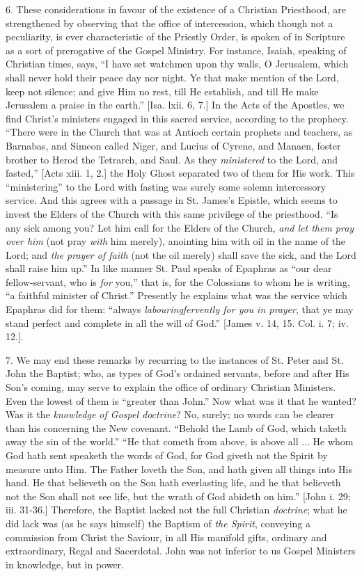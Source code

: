 6. These considerations in favour of the existence of a Christian
Priesthood, are strengthened by observing that the office of
intercession, which though not a peculiarity, is ever characteristic of
the Priestly Order, is spoken of in Scripture as a sort of prerogative
of the Gospel Ministry. For instance, Isaiah, speaking of Christian
times, says, ``I have set watchmen upon thy walls, O Jerusalem,
which shall never hold their peace day nor night. Ye that make mention
of the Lord, keep not silence; and give Him no rest, till He establish,
and till He make Jerusalem a praise in the earth.'' [Isa. lxii. 6,
7.] In the Acts of the Apostles, we find Christ's ministers engaged in
this sacred service, according to the prophecy. ``There were in the
Church that was at Antioch certain prophets and teachers, as Barnabas,
and Simeon called Niger, and Lucius of Cyrene, and Manaen, foster
brother to Herod the Tetrarch, and Saul. As they \emph{ministered} to
the Lord, and fasted,'' [Acts xiii. 1, 2.] the Holy Ghost separated
two of them for His work. This ``ministering'' to the Lord with
fasting was surely some solemn intercessory service. And this agrees
with a passage in St. James's Epistle, which seems to invest the Elders
of the Church with this same privilege of the priesthood. ``Is any
sick among you? Let him call for the Elders of the Church, \emph{and let
them pray over him} (not pray \emph{with} him merely), anointing him
with oil in the name of the Lord; and \emph{the prayer of faith} (not
the oil merely) shall save the sick, and the Lord shall raise him
up.'' In like manner St. Paul speaks of Epaphras as ``our dear
fellow-servant, who is \emph{for} you,'' that is, for the Colossians
to whom he is writing, ``a faithful minister of Christ.''
Presently he explains what was the service which Epaphras did for them:
``always \emph{labouring}\emph{fervently for you in prayer}, that ye may
stand perfect and complete in all the will of God.'' [James v. 14,
15. Col. i. 7; iv. 12.].

7. We may end these remarks by recurring to the instances of St.
Peter and St. John the Baptist; who, as types of God's ordained
servants, before and after His Son's coming, may serve to explain the
office of ordinary Christian Ministers. Even the lowest of them is
``greater than John.'' Now what was it that he wanted? Was it
the \emph{knowledge of Gospel doctrine}? No, surely; no words can be
clearer than his concerning the New covenant. ``Behold the Lamb of
God, which taketh away the sin of the world.'' ``He that cometh
from above, is above all ... He whom God hath sent speaketh the words of
God, for God giveth not the Spirit by measure unto Him. The Father
loveth the Son, and hath given all things into His hand. He that
believeth on the Son hath everlasting life, and he that believeth not
the Son shall not see life, but the wrath of God abideth on him.''
[John i. 29; iii. 31-36.] Therefore, the Baptist lacked not the full
Christian \emph{doctrine}; what he did lack was (as he says himself) the
Baptism of \emph{the Spirit}, conveying a commission from Christ the
Saviour, in all His manifold gifts, ordinary and extraordinary, Regal
and Sacerdotal. John was not inferior to us Gospel Ministers in
knowledge, but in power.

